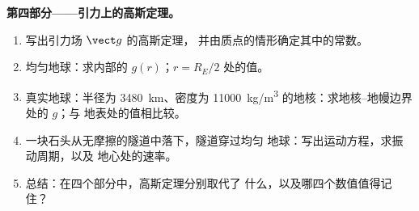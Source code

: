 \begin{problem}
\medskip
\noindent\textbf{第四部分——引力上的高斯定理。}
\begin{enumerate}[resume]
  \item 写出引力场 $\vect g$ 的高斯定理，
        并由质点的情形确定其中的常数。
  \item 均匀地球：求内部的 $g(r)$；$r = R_E/2$ 处的值。
  \item 真实地球：半径为 \qty{3480}{km}、密度为
        \qty{11000}{kg/m^3} 的地核：求地核–地幔边界处的 $g$；与
        地表处的值相比较。
  \item 一块石头从无摩擦的隧道中落下，隧道穿过均匀
        地球：写出运动方程，求振动周期，以及
        地心处的速率。
  \item 总结：在四个部分中，高斯定理分别取代了
        什么，以及哪四个数值值得记住？
\end{enumerate}
\end{problem}
